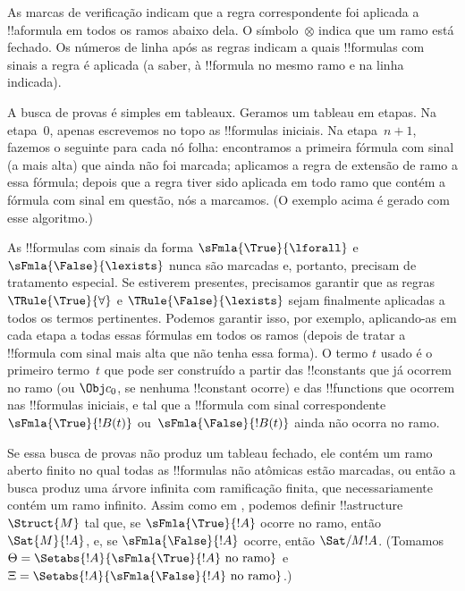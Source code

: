 \documentclass[../../../include/open-logic-section]{subfiles}
\begin{document}
As marcas de verificação indicam que a regra correspondente foi aplicada
a !!a{formula} em todos os ramos abaixo dela. O símbolo~$\otimes$ indica
que um ramo está fechado. Os números de linha após as regras indicam a
quais !!{formula}s com sinais a regra é aplicada (a saber, à !!{formula}
no mesmo ramo e na linha indicada).

A busca de provas é simples em tableaux. Geramos um tableau em etapas.
Na etapa~$0$, apenas escrevemos no topo as !!{formula}s iniciais. Na
etapa~$n+1$, fazemos o seguinte para cada nó folha: encontramos a primeira
fórmula com sinal (a mais alta) que ainda não foi marcada; aplicamos a
regra de extensão de ramo a essa fórmula; depois que a regra tiver sido
aplicada em todo ramo que contém a fórmula com sinal em questão, nós a
marcamos. (O exemplo acima é gerado com esse algoritmo.)

As !!{formula}s com sinais da forma $\sFmla{\True}{\lforall}$ e
$\sFmla{\False}{\lexists}$ nunca são marcadas e, portanto, precisam de
tratamento especial. Se estiverem presentes, precisamos garantir que as
regras $\TRule{\True}{\forall}$ e $\TRule{\False}{\lexists}$ sejam
finalmente aplicadas a todos os termos pertinentes. Podemos garantir isso,
por exemplo, aplicando-as em cada etapa a todas essas fórmulas em todos os
ramos (depois de tratar a !!{formula} com sinal mais alta que não tenha
essa forma). O termo $t$ usado é o primeiro termo~$t$ que pode ser
construído a partir das !!{constant}s que já ocorrem no ramo (ou $\Obj
c_0$, se nenhuma !!{constant} ocorre) e das !!{function}s que ocorrem nas
!!{formula}s iniciais, e tal que a !!{formula} com sinal correspondente
$\sFmla{\True}{!B(t)}$ ou~$\sFmla{\False}{!B(t)}$ ainda não ocorra no
ramo.

Se essa busca de provas não produz um tableau fechado, ele contém um
ramo aberto finito no qual todas as !!{formula}s não atômicas estão
marcadas, ou então a busca produz uma árvore infinita com ramificação
finita, que necessariamente contém um ramo infinito. Assim como em
, podemos definir !!a{structure}~$\Struct{M}$ tal que,
se $\sFmla{\True}{!A}$ ocorre no ramo, então $\Sat{M}{!A}$, e, se
$\sFmla{\False}{!A}$ ocorre, então $\Sat/{M}{!A}$. (Tomamos $\Theta =
\Setabs{!A}{\sFmla{\True}{!A} \text{ no ramo}}$ e $\Xi =
\Setabs{!A}{\sFmla{\False}{!A} \text{ no ramo}}$.)
\end{document}
